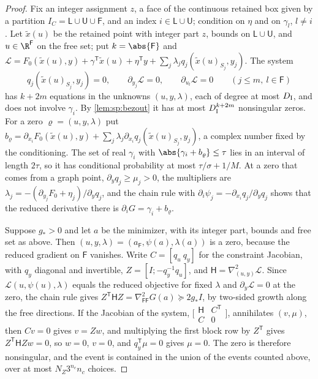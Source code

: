 \begin{proof}
Fix an integer assignment $z$, a face of the continuous retained box given by
a partition $I_C=\mathsf L\cup\mathsf U\cup\mathsf F$, and an index
$i\in\mathsf L\cup\mathsf U$; condition on $\eta$ and on $\gamma_l$, $l\ne i$.
Let $\tilde x(u)$ be the retained point with integer part $z$, bounds on
$\mathsf L\cup\mathsf U$, and $u\in\R^{\mathsf F}$ on the free set; put
$k=\abs{\mathsf F}$ and $\mathcal L=F_0(\tilde x(u),y)+\gamma^{\mathsf
T}\tilde x(u)+\eta^{\mathsf T}y+\sum_j\lambda_jq_j(\tilde x(u)_{S_j},y_j)$.
The system
\[
 q_j(\tilde x(u)_{S_j},y_j)=0,\qquad \partial_{y_j}\mathcal L=0,\qquad
 \partial_{u_l}\mathcal L=0\qquad(j\le m,\ l\in\mathsf F)
\]
has $k+2m$ equations in the unknowns $(u,y,\lambda)$, each of degree at most
$D_{\rm I}$, and does not involve $\gamma_i$. By \cref{lem:sp:bezout} it has at
most $D_{\rm I}^{k+2m}$ nonsingular zeros. For a zero $\varrho=(u,y,\lambda)$ put
$b_\varrho=\partial_{x_i}F_0(\tilde x(u),y)+\sum_j\lambda_j\partial_{x_i}q_j(\tilde
x(u)_{S_j},y_j)$, a complex number fixed by the conditioning. The set of real
$\gamma_i$ with $\abs{\gamma_i+b_\varrho}\le\tau$ lies in an interval of length
$2\tau$, so it has conditional probability at most $\tau/\sigma+1/M$. At a zero
that comes from a graph point, $\partial_yq_j\ge\mu_j>0$, the multipliers are
$\lambda_j=-(\partial_{y_j}F_0+\eta_j)/\partial_yq_j$, and the chain rule with
$\partial_i\psi_j=-\partial_{x_i}q_j/\partial_yq_j$ shows that the reduced
derivative there is $\partial_iG=\gamma_i+b_\varrho$.

Suppose $g_*>0$ and let $a$ be the minimizer, with its integer part, bounds
and free set as above. Then $(u,y,\lambda)=(a_{\mathsf F},\psi(a),\lambda(a))$
is a zero, because the reduced gradient on $\mathsf F$ vanishes. Write
$C=[q_u\ q_y]$ for the constraint Jacobian, with $q_y$ diagonal and
invertible, $Z=[I;-q_y^{-1}q_u]$, and $\mathsf H=\nabla^2_{(u,y)}\mathcal L$.
Since $\mathcal L(u,\psi(u),\lambda)$ equals the reduced objective for fixed
$\lambda$ and $\partial_y\mathcal L=0$ at the zero, the chain rule gives
$Z^{\mathsf T}\mathsf HZ=\nabla^2_{\mathsf F\mathsf F}G(a)\succeq2g_*I$, by
two-sided growth along the free directions. If the Jacobian of the system,
$\bigl[\begin{smallmatrix}\mathsf H&C^{\mathsf T}\\C&0\end{smallmatrix}\bigr]$,
annihilates $(v,\mu)$, then $Cv=0$ gives $v=Zw$, and multiplying the first
block row by $Z^{\mathsf T}$ gives $Z^{\mathsf T}\mathsf HZw=0$, so $w=0$, $v=0$,
and $q_y^{\mathsf T}\mu=0$ gives $\mu=0$. The zero is therefore nonsingular,
and the event is contained in the union of the events counted above, over at
most $N_Z3^{n_c}n_c$ choices.
\end{proof}

